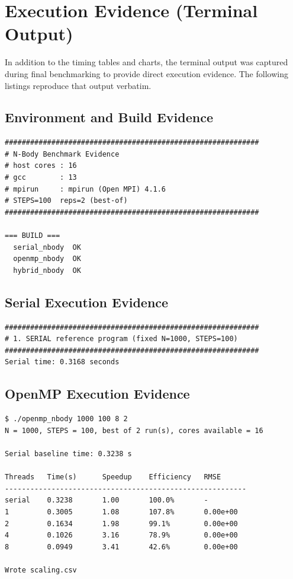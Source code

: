 \documentclass[11pt,a4paper]{article}
\begin{document}
\section{Execution Evidence (Terminal Output)}

In addition to the timing tables and charts, the terminal output was captured
during final benchmarking to provide direct execution evidence. The following
listings reproduce that output verbatim.

\subsection{Environment and Build Evidence}

\begin{lstlisting}[caption={Benchmark environment and successful build of all three implementations}]
############################################################
# N-Body Benchmark Evidence
# host cores : 16
# gcc        : 13
# mpirun     : mpirun (Open MPI) 4.1.6
# STEPS=100  reps=2 (best-of)
############################################################

=== BUILD ===
  serial_nbody  OK
  openmp_nbody  OK
  hybrid_nbody  OK
\end{lstlisting}

\subsection{Serial Execution Evidence}

\begin{lstlisting}[caption={Serial reference programme, $N=1000$, 100 steps. Time: 0.3168\,s}]
############################################################
# 1. SERIAL reference program (fixed N=1000, STEPS=100)
############################################################
Serial time: 0.3168 seconds
\end{lstlisting}

\subsection{OpenMP Execution Evidence}

\begin{lstlisting}[caption={OpenMP scaling sweep, $N=1000$. Best speedup 3.41$\times$ at 8 threads}]
$ ./openmp_nbody 1000 100 8 2
N = 1000, STEPS = 100, best of 2 run(s), cores available = 16

Serial baseline time: 0.3238 s

Threads   Time(s)      Speedup    Efficiency   RMSE
---------------------------------------------------------
serial    0.3238       1.00       100.0%       -
1         0.3005       1.08       107.8%       0.00e+00
2         0.1634       1.98       99.1%        0.00e+00
4         0.1026       3.16       78.9%        0.00e+00
8         0.0949       3.41       42.6%        0.00e+00

Wrote scaling.csv
\end{lstlisting}
\end{document}
